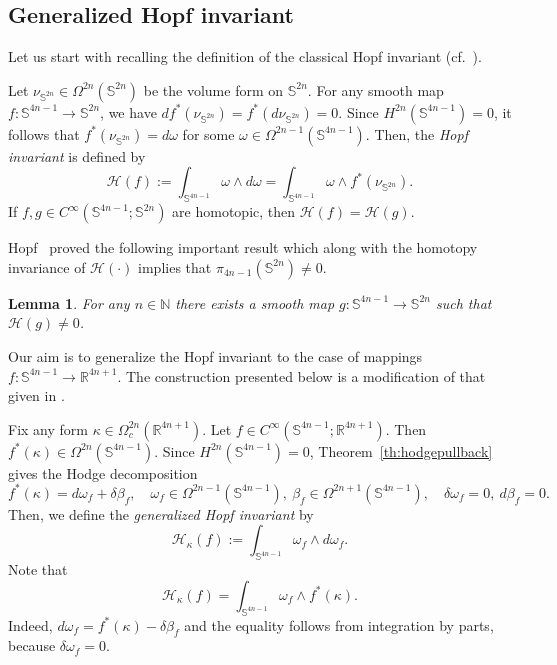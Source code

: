 \documentclass[intlimits,12pt,reqno]{amsart}
\newcommand{\Sph}{\mathbb S}
\newcommand{\R}{\mathbb R}
\numberwithin{equation}{section}
\newtheorem{lemma}[theorem]{Lemma}
\theoremstyle{definition}
\newcommand{\HI}{\mathcal{H}}
\begin{document}
\subsection{Generalized Hopf invariant}
Let us start with recalling the definition of the classical Hopf invariant (cf.\ \cite{BT82}).

Let $\nu_{\Sph^{2n}}\in\Omega^{2n}(\Sph^{2n})$ be the volume form on $\Sph^{2n}$. For any smooth map $f:\Sph^{4n-1}\to\Sph^{2n}$, we have $df^*(\nu_{\Sph^{2n}})=f^*(d\nu_{\Sph^{2n}})=0$. Since $H^{2n}(\Sph^{4n-1})=0$, it follows that $f^*(\nu_{\Sph^{2n}})=d\omega$ for some $\omega\in \Omega^{2n-1}(\Sph^{4n-1})$. Then, the {\em Hopf invariant} is defined by
$$
\HI(f):=\int_{\Sph^{4n-1}}\omega\wedge d\omega=\int_{\Sph^{4n-1}}\omega\wedge f^*(\nu_{\Sph^{2n}}).
$$
If $f,g\in C^\infty(\Sph^{4n-1};\Sph^{2n})$ are homotopic, then $\HI(f)=\HI(g)$.

Hopf~\cite[Satz II, Satz II']{Hopf} proved the following important result which along with the homotopy invariance of $\HI(\cdot)$ implies that $\pi_{4n-1}(\Sph^{2n})\neq 0$.
\begin{lemma}
\label{la:hopffibration}
For any $n \in \mathbb{N}$ there exists a smooth map
$g: \mathbb{S}^{4n-1} \to \mathbb{S}^{2n}$ such that $\HI (g) \neq 0$.
\end{lemma}
Our aim is to generalize the Hopf invariant to the case of mappings $f:\Sph^{4n-1}\to\R^{4n+1}$. The construction presented below is a modification of that given in \cite{HST14}.




Fix any form $\kappa\in\Omega_c^{2n}(\R^{4n+1})$. Let $f\in C^\infty(\Sph^{4n-1};\R^{4n+1})$. Then $f^*(\kappa)\in\Omega^{2n}(\Sph^{4n-1})$. Since $H^{2n}(\Sph^{4n-1})=0$, Theorem~\ref{th:hodgepullback} gives the Hodge decomposition
\begin{equation}
\label{eq162}
f^*(\kappa)=d\omega_f+\delta\beta_f,
\quad
\omega_f\in\Omega^{2n-1}(\Sph^{4n-1}),\ 
\beta_f\in\Omega^{2n+1}(\Sph^{4n-1}),
\quad
\delta\omega_f=0,\ d\beta_f=0.
\end{equation}
Then, we define the {\em generalized Hopf invariant} by
$$
\HI_\kappa(f):=\int_{\Sph^{4n-1}}\omega_f\wedge d\omega_f.
$$
Note that
\begin{equation}
\label{eq169}
\HI_\kappa(f)=\int_{\Sph^{4n-1}} \omega_f\wedge f^*(\kappa).
\end{equation}
Indeed, $d\omega_f=f^*(\kappa)-\delta\beta_f$ and the equality follows from integration by parts, because $\delta\omega_f=0$.
\end{document}
